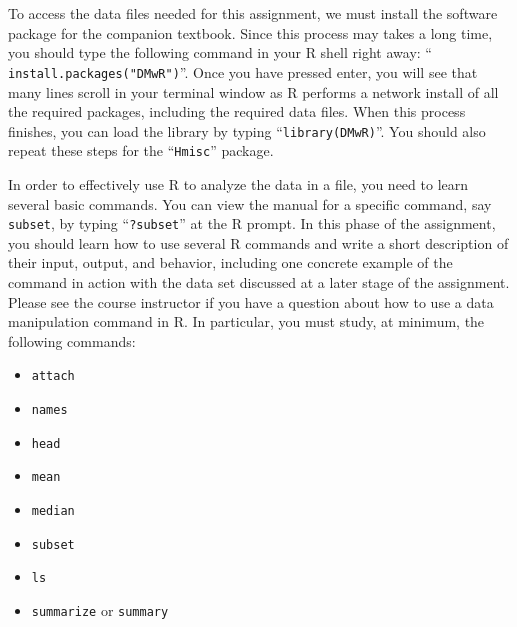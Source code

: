 To access the data files needed for this assignment, we must install the software package for the companion textbook.
Since this process may takes a long time, you should type the following command in your R shell right away: ``{\tt
  install.packages("DMwR")}''. Once you have pressed enter, you will see that many lines scroll in your terminal window
as R performs a network install of all the required packages, including the required data files.  When this process
finishes, you can load the library by typing ``{\tt library(DMwR)}''. You should also repeat these steps for the
``{\tt Hmisc}'' package.

In order to effectively use R to analyze the data in a file, you need to learn several basic commands. You can view the
manual for a specific command, say {\tt subset}, by typing ``{\tt ?subset}'' at the R prompt. In this phase of the
assignment, you should learn how to use several R commands and write a short description of their input, output, and
behavior, including one concrete example of the command in action with the data set discussed at a later stage of the
assignment. Please see the course instructor if you have a question about how to use a data manipulation command in R.
In particular, you must study, at minimum, the following commands:

\begin{itemize}
    \itemsep0pt
  \item {\tt attach}
  \item {\tt names}
  \item {\tt head}
  \item {\tt mean}
  \item {\tt median}
  \item {\tt subset}
  \item {\tt ls}
  \item {\tt summarize} or {\tt summary}
\end{itemize}


  


